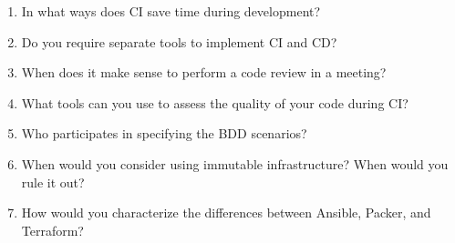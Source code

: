 \begin{enumerate}
\item
In what ways does CI save time during development?

\item
Do you require separate tools to implement CI and CD?

\item
When does it make sense to perform a code review in a meeting?

\item
What tools can you use to assess the quality of your code during CI?

\item
Who participates in specifying the BDD scenarios?

\item
When would you consider using immutable infrastructure? When would you rule it out?

\item
How would you characterize the differences between Ansible, Packer, and Terraform?
\end{enumerate}